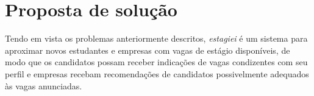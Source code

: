\section{Proposta de solução}
Tendo em vista os problemas anteriormente descritos, \emph{estagiei} é um sistema para aproximar novos estudantes e empresas com vagas de estágio disponíveis, de modo que os candidatos possam receber indicações de vagas condizentes com seu perfil e empresas recebam recomendações de candidatos possivelmente adequados às vagas anunciadas.